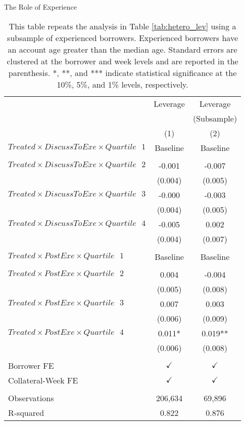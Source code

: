     
\begin{table}[ht!]
\caption{The Role of Experience }\label{tab:soph_baseline}
\caption*{ This table repeats the analysis in Table \ref{tab:hetero_lev} using a subsample of experienced borrowers. Experienced borrowers have an account age greater than the median age. Standard errors are clustered at the borrower and week levels and are reported in the parenthesis. *, **, and *** indicate statistical significance at the 10\%, 5\%, and 1\% levels, respectively. }


\centering
\def\sym#1{\ifmmode^{#1}\else\(^{#1}\)\fi}


\begin{tabular*}{\linewidth}{@{\extracolsep{\fill}}lcc }
     \toprule
          & Leverage & Leverage \\
          &       & (Subsample) \\
          & (1)   & (2) \\

\cmidrule{2-3}     $Treated \times DiscussToExe \times Quartile\text{ }1$ & Baseline    & Baseline \\
          &       &  \\
    $Treated \times DiscussToExe \times Quartile\text{ }2$ & -0.001 & -0.007 \\
          & (0.004) & (0.005) \\[2pt]
     $Treated \times DiscussToExe \times Quartile\text{ }3$ & -0.000 & -0.003 \\
          & (0.004) & (0.005) \\[2pt]
    $Treated \times DiscussToExe \times Quartile\text{ }4$ & -0.005 & 0.002 \\
          & (0.004) & (0.007) \\
          &       &  \\
     $Treated \times PostExe \times Quartile\text{ }1$  & Baseline     & Baseline \\
          &       &  \\
    $Treated \times PostExe \times Quartile\text{ }2$ & 0.004 & -0.004 \\
          & (0.005) & (0.008) \\[2pt]
     $Treated \times PostExe \times Quartile\text{ }3$  & 0.007 & 0.003 \\
          & (0.006) & (0.009) \\[2pt]
     $Treated \times PostExe \times Quartile\text{ }4$  & 0.011* & 0.019** \\
          & (0.006) & (0.008) \\
          &       &  \\
    Borrower FE &    $\checkmark$     & $\checkmark$   \\
    Collateral-Week FE &  $\checkmark$       & $\checkmark$   \\
          &       &  \\
    Observations & 206,634 & 69,896 \\
    R-squared & 0.822 & 0.876 \\
    \bottomrule
          \end{tabular*} 



\end{table}%


